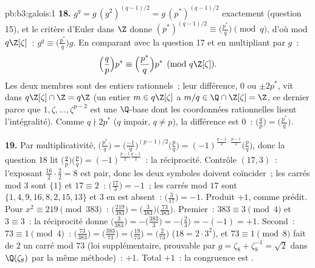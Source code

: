 \begin{solution}{pb:b3:galois:1}
\textbf{18.} $g^q = g\,(g^2)^{(q-1)/2} = g\,(p^*)^{(q-1)/2}$
exactement (question 15), et le critère d'Euler dans $\Z$
donne $(p^*)^{(q-1)/2} \equiv \bigl(\frac{p^*}q\bigr) \pmod
q$, d'où mod $q\Z[\zeta]$~: $g^q \equiv
\bigl(\frac{p^*}q\bigr)g$. En comparant avec la question 17
et en multipliant par $g$~:
\[
\Bigl(\frac qp\Bigr)p^* \equiv \Bigl(\frac{p^*}q\Bigr)p^*
\pmod{q\Z[\zeta]} .
\]
Les deux membres sont des entiers rationnels~; leur
différence, $0$ ou $\pm2p^*$, vit dans $q\Z[\zeta] \cap \Z =
q\Z$ (un entier $m \in q\Z[\zeta]$ a $m/q \in \Q \cap
\Z[\zeta] = \Z$, ce dernier parce que $1, \zeta, \dots,
\zeta^{p-2}$ est une $\Q$-base dont les coordonnées
rationnelles lisent l'intégralité). Comme $q \nmid 2p^*$ ($q$
impair, $q \neq p$), la différence est $0$~:
$\bigl(\frac qp\bigr) = \bigl(\frac{p^*}q\bigr)$.

\textbf{19.} Par multiplicativité, $\bigl(\frac{p^*}q\bigr) =
\bigl(\frac{-1}q\bigr)^{(p-1)/2}\bigl(\frac pq\bigr) =
(-1)^{\frac{q-1}2\cdot\frac{p-1}2}\bigl(\frac pq\bigr)$,
donc la question 18 lit $\bigl(\frac qp\bigr)\bigl(\frac
pq\bigr) = (-1)^{\frac{p-1}2\frac{q-1}2}$~: la réciprocité.
Contrôle $(17, 3)$~: l'exposant $\frac{16}2\cdot\frac22 = 8$
est pair, donc les deux symboles doivent coïncider~; les
carrés mod $3$ sont $\{1\}$ et $17 \equiv 2$~:
$\bigl(\frac{17}3\bigr) = -1$~; les carrés mod $17$ sont
$\{1, 4, 9, 16, 8, 2, 15, 13\}$ et $3$ en est absent~:
$\bigl(\frac3{17}\bigr) = -1$. Produit $+1$, comme prédit.
Pour $x^2 \equiv 219 \pmod{383}$~: $\bigl(\frac{219}{383}
\bigr) = \bigl(\frac3{383}\bigr)\bigl(\frac{73}{383}\bigr)$.
Premier~: $383 \equiv 3 \pmod4$ et $3 \equiv 3$~: la
réciprocité donne $\bigl(\frac3{383}\bigr) =
-\bigl(\frac{383}3\bigr) = -\bigl(\frac23\bigr) = -(-1) =
+1$. Second~: $73 \equiv 1 \pmod 4$~:
$\bigl(\frac{73}{383}\bigr) = \bigl(\frac{383}{73}\bigr) =
\bigl(\frac{18}{73}\bigr) = \bigl(\frac2{73}\bigr)$ ($18 =
2\cdot3^2$), et $73 \equiv 1 \pmod 8$ fait de $2$ un carré
mod $73$ (loi supplémentaire, prouvable par $g = \zeta_8 +
\zeta_8^{-1} = \sqrt2$ dans $\Q(\zeta_8)$ par la même
méthode)~: $+1$. Total $+1$~: la congruence est .


\end{solution}
